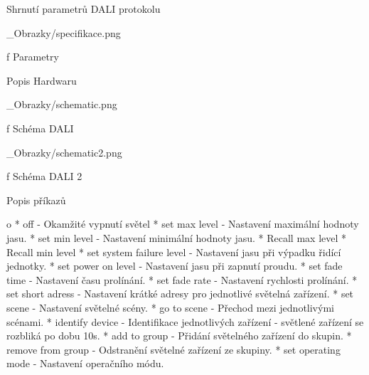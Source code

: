 \sec Shrnutí parametrů DALI protokolu

\medskip {}
\picw=12cm _Obrazky/specifikace.png
\caption/f Parametry
\medskip

\sec Popis Hardwaru

\medskip {}
\picw=12cm _Obrazky/schematic.png
\caption/f Schéma DALI
\medskip

\medskip {}
\picw=12cm _Obrazky/schematic2.png
\caption/f Schéma DALI 2
\medskip


\sec Popis příkazů

\begitems \style o
* off - Okamžité vypnutí světel
* set max level - Nastavení maximální hodnoty jasu.
* set min level - Nastavení minimální hodnoty jasu.
* Recall max level
* Recall min level
* set system failure level - Nastavení jasu při výpadku řidící jednotky.
* set power on level - Nastavení jasu při zapnutí proudu.
* set fade time - Nastavení času prolínání.
* set fade rate - Nastavení rychlosti prolínání.
* set short adress - Nastavení krátké adresy pro jednotlivé světelná zařízení.
* set scene - Nastavení světelné scény.
* go to scene - Přechod mezi jednotlivými scénami.
* identify device - Identifikace jednotlivých zařízení - světlené zařízení se rozbliká po dobu 10s.
* add to group - Přidání světelného zařízení do skupin.
* remove from group - Odstranění světelné zařízení ze skupiny.
* set operating mode - Nastavení operačního módu.
\enditems
\medskip

